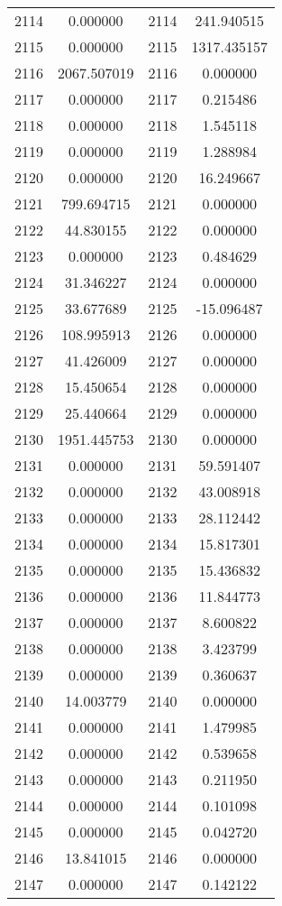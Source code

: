 \documentclass[12pt]{article}
\begin{document}
\begin{longtable}{@{}cccc@{}}
2114 & 0.000000 & 2114 & 241.940515 \\
2115 & 0.000000 & 2115 & 1317.435157 \\
2116 & 2067.507019 & 2116 & 0.000000 \\
2117 & 0.000000 & 2117 & 0.215486 \\
2118 & 0.000000 & 2118 & 1.545118 \\
2119 & 0.000000 & 2119 & 1.288984 \\
2120 & 0.000000 & 2120 & 16.249667 \\
2121 & 799.694715 & 2121 & 0.000000 \\
2122 & 44.830155 & 2122 & 0.000000 \\
2123 & 0.000000 & 2123 & 0.484629 \\
2124 & 31.346227 & 2124 & 0.000000 \\
2125 & 33.677689 & 2125 & -15.096487 \\
2126 & 108.995913 & 2126 & 0.000000 \\
2127 & 41.426009 & 2127 & 0.000000 \\
2128 & 15.450654 & 2128 & 0.000000 \\
2129 & 25.440664 & 2129 & 0.000000 \\
2130 & 1951.445753 & 2130 & 0.000000 \\
2131 & 0.000000 & 2131 & 59.591407 \\
2132 & 0.000000 & 2132 & 43.008918 \\
2133 & 0.000000 & 2133 & 28.112442 \\
2134 & 0.000000 & 2134 & 15.817301 \\
2135 & 0.000000 & 2135 & 15.436832 \\
2136 & 0.000000 & 2136 & 11.844773 \\
2137 & 0.000000 & 2137 & 8.600822 \\
2138 & 0.000000 & 2138 & 3.423799 \\
2139 & 0.000000 & 2139 & 0.360637 \\
2140 & 14.003779 & 2140 & 0.000000 \\
2141 & 0.000000 & 2141 & 1.479985 \\
2142 & 0.000000 & 2142 & 0.539658 \\
2143 & 0.000000 & 2143 & 0.211950 \\
2144 & 0.000000 & 2144 & 0.101098 \\
2145 & 0.000000 & 2145 & 0.042720 \\
2146 & 13.841015 & 2146 & 0.000000 \\
2147 & 0.000000 & 2147 & 0.142122 \\

\end{longtable}
\end{document}
